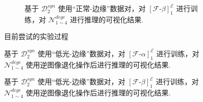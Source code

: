 \documentclass[a4paper]{ctexart}
\begin{document}
\begin{figure}[htbp]
\begin{subfigure}{0.45\textwidth}
				\captionsetup{font=scriptsize}
				\caption{基于 $\mathcal{D}^{syn}_{2}$ 使用“正常-边缘”数据对，对 ${\left[\mathcal{F}\text{-}\beta\right]}^{\mathcal{E}}_1$ 进行训练，对 $\mathcal{N}_{1 \sim 4}^{dege}$ 进行推理的可视化结果.}
				\label{fig: LLtoEdge(trainbasenormal)}
			\end{subfigure}
			\caption{目前尝试的实验过程}
		\end{figure}
		
		\begin{figure}[htbp]
			\centering
			\caption{基于 $\mathcal{D}^{syn}_{2}$ 使用“低光-边缘”数据对，对 ${\left[\mathcal{F}\text{-}\alpha\right]}^{\mathcal{E}}_1$ 进行训练，对 $\mathcal{N}_{1 \sim 4}^{dege}$ 使用逆图像退化操作后进行推理的可视化结果.}
		\end{figure}
		
		\begin{figure}[htbp]
			\centering
			\caption{基于 $\mathcal{D}^{syn}_{2}$ 使用“低光-边缘”数据对，对 ${\left[\mathcal{F}\text{-}\beta\right]}^{\mathcal{E}}_1$ 进行训练，对 $\mathcal{N}_{1 \sim 4}^{dege}$ 使用逆图像退化操作后进行推理的可视化结果.}
		\end{figure}
		
\end{document}
